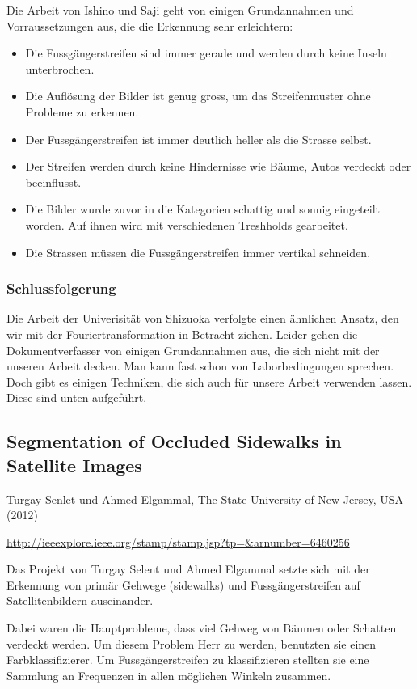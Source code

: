 Die Arbeit von Ishino und Saji geht von einigen Grundannahmen und Vorraussetzungen aus, die die Erkennung sehr erleichtern:

\begin{itemize}
	\item Die Fussgängerstreifen sind immer gerade und werden durch keine Inseln unterbrochen.
	\item Die Auflösung der Bilder ist genug gross, um das Streifenmuster ohne Probleme zu erkennen.
	\item Der Fussgängerstreifen ist immer deutlich heller als die Strasse selbst.
	\item Der Streifen werden durch keine Hindernisse wie Bäume, Autos verdeckt oder beeinflusst.
	\item Die Bilder wurde zuvor in die Kategorien schattig und sonnig eingeteilt worden. Auf ihnen wird mit verschiedenen Treshholds gearbeitet.
	\item Die Strassen müssen die Fussgängerstreifen immer vertikal schneiden.
\end{itemize}

\subsubsection{Schlussfolgerung}
Die Arbeit der Univerisität von Shizuoka verfolgte einen ähnlichen Ansatz, den wir mit der Fouriertransformation in Betracht ziehen. Leider gehen die Dokumentverfasser von einigen Grundannahmen aus, die sich nicht mit der unseren Arbeit decken. Man kann fast schon von Laborbedingungen sprechen.
Doch gibt es einigen Techniken, die sich auch für unsere Arbeit verwenden lassen. Diese sind unten aufgeführt.

\subsection{Segmentation of Occluded Sidewalks in Satellite Images}
Turgay Senlet und Ahmed Elgammal, The State University of New Jersey, USA (2012) \newline

\onehalfspacing
\url{http://ieeexplore.ieee.org/stamp/stamp.jsp?tp=\&arnumber=6460256}
\onehalfspacing
\newline


Das Projekt von Turgay Selent und Ahmed Elgammal setzte sich mit der Erkennung von primär Gehwege (sidewalks) und Fussgängerstreifen auf Satellitenbildern auseinander.

Dabei waren die Hauptprobleme, dass viel Gehweg von Bäumen oder Schatten verdeckt werden. Um diesem Problem Herr zu werden, benutzten sie einen Farbklassifizierer.
Um Fussgängerstreifen zu klassifizieren stellten sie eine Sammlung an Frequenzen in allen möglichen Winkeln zusammen. 

